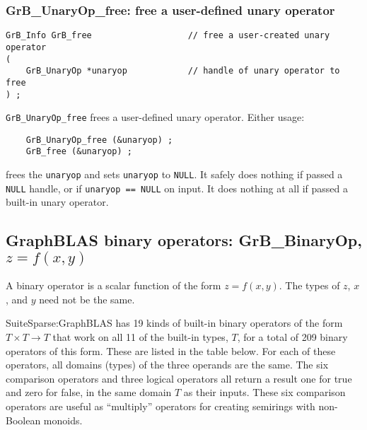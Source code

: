 \documentclass[12pt]{article}
\begin{document}
\subsubsection{{\sf GrB\_UnaryOp\_free:} free a user-defined unary operator}
\label{unaryop_free}

\begin{mdframed}[userdefinedwidth=6in]
{\footnotesize
\begin{verbatim}
GrB_Info GrB_free                   // free a user-created unary operator
(
    GrB_UnaryOp *unaryop            // handle of unary operator to free
) ;
\end{verbatim}
}\end{mdframed}

\verb'GrB_UnaryOp_free' frees a user-defined unary operator.
Either usage:

    {\small
    \begin{verbatim}
    GrB_UnaryOp_free (&unaryop) ;
    GrB_free (&unaryop) ; \end{verbatim}}

\noindent
frees the \verb'unaryop' and sets \verb'unaryop' to \verb'NULL'.
It safely does nothing if passed a \verb'NULL'
handle, or if \verb'unaryop == NULL' on input.
It does nothing at all if passed a built-in unary operator.

\newpage
\subsection{GraphBLAS binary operators: {\sf GrB\_BinaryOp}, $z=f(x,y)$} %
\label{binaryop}

A binary operator is a scalar function of the form $z=f(x,y)$.  The types of
$z$, $x$, and $y$ need not be the same.

SuiteSparse:GraphBLAS has 19 kinds of built-in binary operators of the form $T
\times T \rightarrow T$ that work on all 11 of the built-in types, $T$, for a
total of 209 binary operators of this form.  These are listed in the table
below.  For each of these operators, all domains (types) of the three operands
are the same.  The six comparison operators and three logical operators all
return a result one for true and zero for false, in the same domain $T$ as
their inputs.  These six comparison operators are useful as ``multiply''
operators for creating semirings with non-Boolean monoids.
\end{document}
